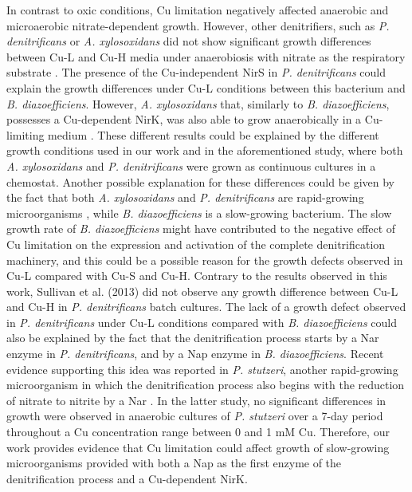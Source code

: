 \documentclass[a4paper,11pt]{article}
\begin{document}
In contrast to oxic conditions, Cu limitation negatively affected anaerobic and microaerobic
nitrate-dependent growth. However, other denitrifiers, such as {\em P. denitrificans}
or {\em A. xylosoxidans} did not show significant growth differences between Cu-L and Cu-H
media under anaerobiosis with nitrate as the respiratory substrate \cite{felgate2012impact}. The presence of
the Cu-independent NirS in {\em P. denitrificans} could explain the growth differences under
Cu-L conditions between this bacterium and {\em B. diazoefficiens}. However, {\em A. xylosoxidans}
that, similarly to {\em B. diazoefficiens}, possesses a Cu-dependent NirK, was also able to grow
anaerobically in a Cu-limiting medium \cite{felgate2012impact}. These different results could be explained
by the different growth conditions used in our work and in the aforementioned study,
where both {\em A. xylosoxidans} and {\em P. denitrificans} were grown as continuous cultures in a
chemostat. Another possible explanation for these differences could be given by the fact
that both {\em A. xylosoxidans} and {\em P. denitrificans} are rapid-growing microorganisms \cite{felgate2012impact}, while
{\em B. diazoefficiens} is a slow-growing bacterium. The slow growth rate of {\em B. diazoefficiens} might
have contributed to the negative effect of Cu limitation on the expression and activation of
the complete denitrification machinery, and this could be a possible reason for the growth
defects observed in Cu-L compared with Cu-S and Cu-H. Contrary to the results observed
in this work, Sullivan et al. (2013) \cite{sullivan2013copper} did not observe any growth difference between
Cu-L and Cu-H in {\em P. denitrificans} batch cultures. The lack of a growth defect observed
in {\em P. denitrificans} under Cu-L conditions \cite{sullivan2013copper} compared with {\em B. diazoefficiens} could also
be explained by the fact that the denitrification process starts by a Nar enzyme in {\em P. denitrificans}, and by a Nap enzyme in
{\em B. diazoefficiens}. Recent evidence supporting this idea was reported in {\em P. stutzeri}, another
rapid-growing microorganism in which the denitrification process also begins with the
reduction of nitrate to nitrite by a Nar \cite{black2016influence}. In the latter study, no significant differences in
growth were observed in anaerobic cultures of {\em P. stutzeri} over a 7-day period throughout a
Cu concentration range between 0 and 1 mM Cu. Therefore, our work provides evidence
that Cu limitation could affect growth of slow-growing microorganisms provided with
both a Nap as the first enzyme of the denitrification process and a Cu-dependent NirK.
\end{document}
